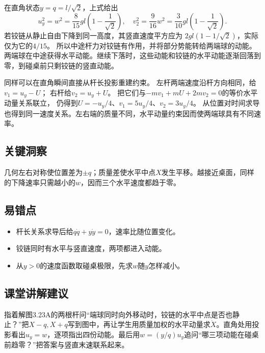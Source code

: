 \documentclass[UTF8,fontset=fandol,a4paper,11pt]{ctexart}
\begin{document}
在直角状态$y=q=l/\sqrt2$，上式给出
\[
u_y^2=w^2=\frac8{15}gl\left(1-\frac1{\sqrt2}\right),
\quad v_2^2=\frac9{16}w^2
=\frac3{10}gl\left(1-\frac1{\sqrt2}\right).
\]
若铰链从静止自由下降到同一高度，其竖直速度平方应为
$2gl(1-1/\sqrt2)$，实际仅为它的$4/15$。
所以中途杆力对铰链有作用，并将部分势能转给两端球的动能。
两端球在中途获得水平动能。继续下落时，这些动能和铰链的水平动能逐渐回落到零，到碰桌前只剩铰链的竖直动能。

同样可以在直角瞬间直接从杆长投影重建约束。
左杆两端速度沿杆方向相同，给$v_1=u_y-U$；
右杆给$v_2=u_y+U$。
把它们与$-mv_1+mU+2mv_2=0$的等价水平动量关系联立，
仍得到$U=-u_y/4$、$v_1=5u_y/4$、$v_2=3u_y/4$。
从位置对时间求导也得到同一速度关系。左右端的质量不同，水平动量约束因而使两端球具有不同速率。




\subsection*{关键洞察}

几何左右对称使位置差为$\pm q$；质量差使水平中点$X$发生平移。越接近桌面，同样的下降速率只需越小的$w$，因而三个水平速度都趋于零。



\subsection*{易错点}

\begin{itemize}
\item 杆长关系求导后给$q\dot q+y\dot y=0$，速率比随位置变化。
\item 铰链同时有水平与竖直速度，两项都进入动能。
\item 从$y>0$的速度函数取碰桌极限，先求$w$随$y$怎样减小。
\end{itemize}



\subsection*{课堂讲解建议}

指着解图3.23A的两根杆问“端球同时向外移动时，铰链的水平中点是否也静止？”把$X-q,X+q$写到图中，再让学生用质量加权的水平动量求$\dot X$。直角处用投影看出$u_y=w$，逐项指出四份动能。最后用$w=(y/q)u_y$追问“哪三项动能在碰桌前趋零？”把答案与竖直末速联系起来。
\end{document}
